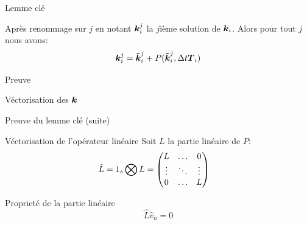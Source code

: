 \begin{frame}{Lemme clé}
\begin{lemma}
 Après renommage sur $j$ en notant ${\boldsymbol {k}}_{i}^{j}$ la $j$ième solution de ${\boldsymbol {k}}_{i}$.
Alors pour tout $j$ nous avons:
\begin{equation*}
  {\boldsymbol {k}}_{i}^{j}={\boldsymbol {\tilde{k}}}_{i}^{j}+P({\boldsymbol {\tilde{k}}}_{i}^{j},\Delta t {\boldsymbol {T}}_{i})
\end{equation*}
\end{lemma}
\begin{block}{Preuve}
\end{block}

\begin{block}{Véctorisation des ${\boldsymbol {k}}$}
 \end{block}

\end{frame}

\begin{frame}[<+->]{Preuve du lemme clé (suite)}
 \begin{block}{Véctorisation de l'opérateur linéaire}
 Soit $L$ la partie linéaire de $P$:
\begin{align*}
\hat{L}&=1_{s}\bigotimes L=\begin{pmatrix}L	&\ldots	&0\\
			\vdots &\ddots 	&\vdots\\
			0	&\ldots	&L\\
	\end{pmatrix}
\end{align*}
\end{block}
\begin{block}{Proprieté de la partie linéaire}
\begin{equation*}
\hat{L}\hat{v}_{n}=0
\end{equation*}
 \end{block}

\end{frame}


